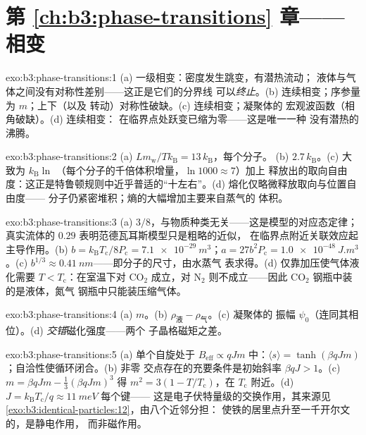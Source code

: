 \section*{第 \ref{ch:b3:phase-transitions} 章——相变}

\begin{solution}{exo:b3:phase-transitions:1}
(a) 一级相变：密度发生跳变，有潜热流动；
液体与气体之间没有对称性差别——这正是它们的分界线
可以\emph{终止}。(b) 连续相变；序参量为 $m$；上下（以及
转动）对称性破缺。(c) 连续相变；凝聚体的
宏观波函数（相角破缺）。(d) 连续相变：
在临界点处跃变已缩为零——这是唯一一种
没有潜热的沸腾。
\end{solution}

\begin{solution}{exo:b3:phase-transitions:2}
(a) $Lm_{\text{w}}/Tk_{\text{B}} = 13\,k_{\text{B}}$，每个分子。
(b) $2.7\,k_{\text{B}}$。(c) 大致为 $k_{\text{B}}\ln$
（每个分子的千倍体积增量，$\ln1000 \approx 7$）加上
释放出的取向自由度：这正是特鲁顿规则中近乎普适的“十左右”。(d)
熔化仅略微释放取向与位置自由度——
分子仍紧密堆积；熵的大幅增加主要来自蒸气的
体积。
\end{solution}

\begin{solution}{exo:b3:phase-transitions:3}
(a) $3/8$，与物质种类无关——这是模型的对应态定律；
真实流体的 $0.29$ 表明范德瓦耳斯模型只是粗略的近似，
在临界点附近关联效应起主导作用。(b) $b =
k_{\text{B}}T_{\text{c}}/8P_{\text{c}} = \qty{7.1e-29}{m^3}$；$a =
27b^2P_{\text{c}} = \qty{1.0e-48}{J.m^3}$。(c) $b^{1/3} \approx
\qty{0.41}{nm}$——即分子的尺寸，由水蒸气
表求得。(d) 仅靠加压使气体液化需要 $T <
T_{\text{c}}$：在室温下对 CO$_2$ 成立，对
N$_2$ 则不成立——因此 CO$_2$ 钢瓶中装的是液体，氮气
钢瓶中只能装压缩气体。
\end{solution}

\begin{solution}{exo:b3:phase-transitions:4}
(a) $m$。(b) $\rho_{\text{液}} - \rho_{\text{气}}$。(c) 凝聚体的
振幅 $\psi_0$（连同其相位）。(d)
\emph{交错}磁化强度——两个
子晶格磁矩之差。
\end{solution}

\begin{solution}{exo:b3:phase-transitions:5}
(a) 单个自旋处于 $B_{\text{eff}} \propto qJm$ 中：$\langle s\rangle =
\tanh(\beta qJm)$；自洽性使循环闭合。(b) 非零
交点存在的充要条件是初始斜率 $\beta qJ > 1$。(c) $m =
\beta qJm - \tfrac13(\beta qJm)^3$ 得 $m^2 = 3(1 -
T/T_{\text{c}})$，在 $T_{\text{c}}$ 附近。(d) $J =
k_{\text{B}}T_{\text{c}}/q \approx \qty{11}{meV}$ 每个键——
这是电子伏特量级的交换作用，其来源见
\cref{exo:b3:identical-particles:12}，由八个近邻分担：
使铁的居里点升至一千开尔文的，是静电作用，
而非磁作用。
\end{solution}

